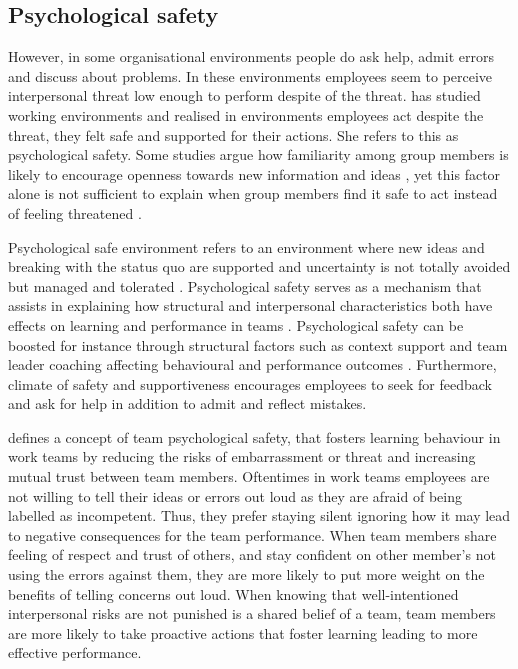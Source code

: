 \subsection{Psychological safety}
However, in some organisational environments people do ask help, admit errors and discuss about problems. In these environments employees seem to perceive interpersonal threat low enough to perform despite of the threat. \citet{edmondson1999psychological} has studied working environments and realised in environments employees act despite the threat, they felt safe and supported for their actions. She refers to this as psychological safety. Some studies argue how familiarity among group members is likely to encourage openness towards new information and ideas \citep{sanna1990valence}, yet this factor alone is not sufficient to explain when group members find it safe to act instead of feeling threatened \citep{edmondson1999psychological}.

Psychological safe environment refers to an environment where new ideas and breaking with the status quo are supported \citep{edmondson1999psychological} and uncertainty is not totally avoided but managed and tolerated \citep{shalley2004leaders}.  Psychological safety serves as a mechanism that assists in explaining how structural and interpersonal characteristics both have effects on learning and performance in teams \citep{edmondson1999psychological}. Psychological safety can be boosted for instance through structural factors such as context support and team leader coaching affecting behavioural and performance outcomes \citep{hackman1987design,edmondson1999psychological}. Furthermore, climate of safety and supportiveness encourages employees to seek for feedback and ask for help in addition to admit and reflect mistakes. \citep{edmondson1999psychological}

\citet{edmondson1999psychological} defines a concept of team psychological safety, that fosters learning behaviour in work teams by reducing the risks of embarrassment or threat and increasing mutual trust between team members. Oftentimes in work teams employees are not willing to tell their ideas or errors out loud as they are afraid of being labelled as incompetent. Thus, they prefer staying silent ignoring how it may lead to negative consequences for the team performance. When team members share feeling of respect and trust of others, and stay confident on other member's not using the errors against them, they are more likely to put more weight on the benefits of telling concerns out loud. When knowing that well-intentioned interpersonal risks are not punished is a shared belief of a team, team members are more likely to take proactive actions that foster learning leading to more effective performance. 

